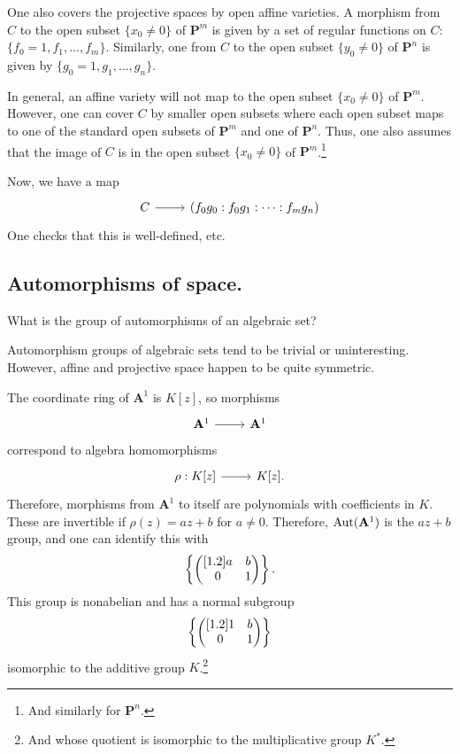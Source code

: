 \documentclass [11 pt, oneside] {article}
\begin{document}
One also covers the projective spaces by open affine varieties. A morphism from $C$ to the open subset $\{x_0\ne 0\}$ of $\mathbf{P}^m$ is given by a set of regular functions on $C$: $\{f_0=1,f_1,\hdots, f_m\}$. Similarly, one from $C$ to the open subset $\{y_0\ne 0\}$ of $\mathbf{P}^n$ is given by $\{g_0=1,g_1,\hdots, g_n\}$. 

In general, an affine variety will not map to the open subset $\{x_0\ne 0\}$ of $\mathbf{P}^m$. However, one can cover $C$ by smaller open subsets where each open subset maps to one of the standard open subsets of $\mathbf{P}^m$ and one of $\mathbf{P}^n$. Thus, one also assumes that the image of $C$ is in the open subset $\{x_0\ne 0\}$ of $\mathbf{P}^m$.\footnote{And similarly for $\mathbf{P}^n$.}

Now, we have a map 
\[
\begin{tikzcd}
C\ar[r]& (f_0g_0:f_0g_1:\cdots:f_mg_n)
\end{tikzcd}
\]
One checks that this is well-defined, etc.

\subsection{Automorphisms of space.}
\begin{problem}
	What is the group of automorphisms of an algebraic set?
\end{problem}

Automorphism groups of algebraic sets tend to be trivial or uninteresting. However, affine and projective space happen to be quite symmetric.

\begin{example}\label{}
The coordinate ring of $\mathbf{A}^1$ is $K[z]$, so morphisms 
\[
\begin{tikzcd}
\mathbf{A}^1\ar[r]& \mathbf{A}^1
\end{tikzcd}
\]
correspond to algebra homomorphisms 
\[
\begin{tikzcd}
\rho:K[z]\ar[r]& K[z].
\end{tikzcd}
\]
Therefore, morphisms from $\mathbf{A}^1$ to itself are polynomials with coefficients in $K$. These are invertible if $\rho(z) = az+b$ for $a\ne 0$. Therefore, $\operatorname{Aut}(\mathbf{A}^1)$ is the $az+b$ group, and one can identify this with
\begin{align*}
	\left\{ \begin{pmatrix} [1.2] a&b\\0&1\end{pmatrix} \right\}. 
\end{align*}
This group is nonabelian and has a normal subgroup 
\begin{align*}
	\left\{\begin{pmatrix} [1.2]  1&b\\0&1\end{pmatrix} \right\} 
\end{align*}
isomorphic to the additive group $K$.\footnote{And whose quotient is isomorphic to the multiplicative group $K^*$.}
\end{example}
\end{document}
